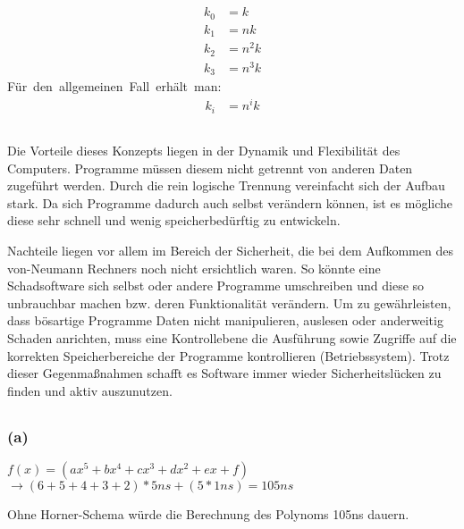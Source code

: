 \documentclass[11pt,a4paper]{article}
\begin{document}
\subsection{} %
\begin{align}
k_{0} &= k\\
k_{1} &= nk\\
k_{2} &= n^{2}k\\
k_{3} &= n^{3}k
\end{align}
\mbox{Für den allgemeinen Fall erhält man:}
\begin{align}
k_{i} &= n^{i}k
\end{align}


\subsection{} %
Die Vorteile dieses Konzepts liegen in der Dynamik und Flexibilität des Computers. Programme müssen diesem nicht getrennt von anderen Daten zugeführt werden. Durch die rein logische Trennung vereinfacht sich der Aufbau stark. Da sich Programme dadurch auch selbst verändern können, ist es mögliche diese sehr schnell und wenig speicherbedürftig zu entwickeln.

Nachteile liegen vor allem im Bereich der Sicherheit, die bei dem Aufkommen des von-Neumann Rechners noch nicht ersichtlich waren. So könnte eine Schadsoftware sich selbst oder andere Programme umschreiben und diese so unbrauchbar machen bzw. deren Funktionalität verändern. Um zu gewährleisten, dass bösartige Programme Daten nicht manipulieren, auslesen oder anderweitig Schaden anrichten, muss eine Kontrollebene die Ausführung sowie Zugriffe auf die korrekten Speicherbereiche der Programme kontrollieren (Betriebssystem). Trotz dieser Gegenmaßnahmen schafft es Software immer wieder Sicherheitslücken zu finden und aktiv auszunutzen.


\subsection{} %

\subsubsection{(a)} %

$f(x) = (ax^{5} + bx^{4} + cx^{3} + dx^{2} + ex + f)$
$\rightarrow (6 + 5 + 4 + 3 + 2) * 5ns + (5 * 1ns) = 105ns$

Ohne Horner-Schema würde die Berechnung des Polynoms 105ns dauern.
\end{document}
